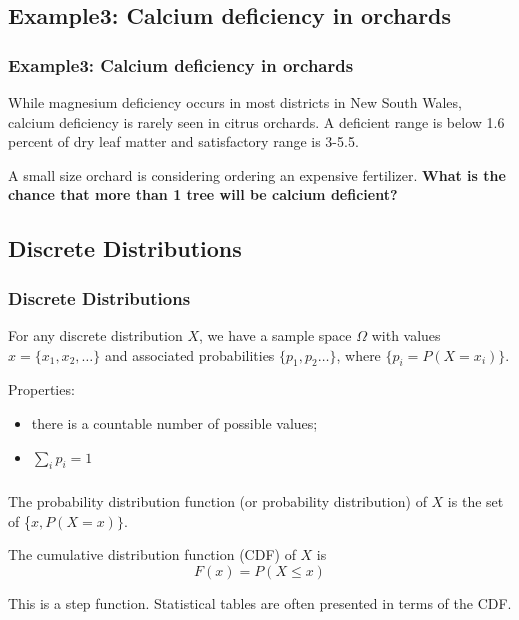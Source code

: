 \documentclass[t,xcolor=pdftex,dvipsnames,table]{beamer}\usepackage[]{graphicx}\usepackage[]{color}
\begin{document}
\subsection{Example3: Calcium deficiency in orchards}
\begin{frame}\frametitle{Example3: Calcium deficiency in orchards}

While magnesium deficiency occurs in most districts in New South Wales, calcium deficiency is rarely seen in citrus orchards. A deficient range is below 1.6 percent of dry leaf matter and satisfactory range is 3-5.5.

\vspace{.5cm}
A small size orchard is considering ordering an expensive fertilizer. {\bf What is the chance that more than 1 tree will be calcium deficient?}

\vspace{.5cm}
\href{http://www.dpi.nsw.gov.au/agriculture/horticulture/citrus/management/nutrition/nutrition}{}
\end{frame}


\subsection{Discrete Distributions}
\begin{frame}\frametitle{Discrete Distributions}
\begin{definition}

For any \alert{discrete} distribution $X$, we have a sample space $\Omega$ with values $x= \{ x_{1}, x_{2}, \ldots \}$ and associated probabilities $\{ p_{1}, p_{2} \ldots \}$, where $\{ p_{i} = P(X=x_{i}) \}$.

\vspace{.5cm}
Properties: 
\begin{itemize}
\item there is a countable number of possible values;
\item $\sum_{i} p_{i} = 1$
\end{itemize}
\end{definition}
\end{frame}

\begin{frame}\frametitle{}
\begin{definition}
The probability distribution function (or probability distribution) of $X$ is 
the set of \{$x, P(X=x) \}$.
\end{definition}

\vspace{.5cm}
\begin{definition}

The cumulative distribution function (CDF) of $X$ is 
\[ F(x) = P(X \leq x) \]

This is a step function. Statistical tables are often presented in terms of the CDF.
\end{definition}
\end{frame}
\end{document}
